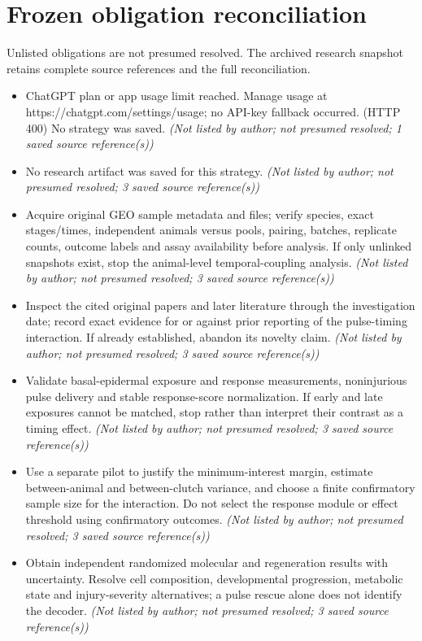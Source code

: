 \documentclass[11pt]{article}
\begin{document}
\section{Frozen obligation reconciliation}
Unlisted obligations are not presumed resolved. The archived research snapshot retains complete source references and the full reconciliation.
\begin{itemize}
\item ChatGPT plan or app usage limit reached. Manage usage at https://chatgpt.com/settings/usage; no API-key fallback occurred. (HTTP 400) No strategy was saved. \textit{ (Not listed by author; not presumed resolved; 1 saved source reference(s))}
\item No research artifact was saved for this strategy. \textit{ (Not listed by author; not presumed resolved; 3 saved source reference(s))}
\item Acquire original GEO sample metadata and files; verify species, exact stages/times, independent animals versus pools, pairing, batches, replicate counts, outcome labels and assay availability before analysis. If only unlinked snapshots exist, stop the animal-level temporal-coupling analysis. \textit{ (Not listed by author; not presumed resolved; 3 saved source reference(s))}
\item Inspect the cited original papers and later literature through the investigation date; record exact evidence for or against prior reporting of the pulse-timing interaction. If already established, abandon its novelty claim. \textit{ (Not listed by author; not presumed resolved; 3 saved source reference(s))}
\item Validate basal-epidermal exposure and response measurements, noninjurious pulse delivery and stable response-score normalization. If early and late exposures cannot be matched, stop rather than interpret their contrast as a timing effect. \textit{ (Not listed by author; not presumed resolved; 3 saved source reference(s))}
\item Use a separate pilot to justify the minimum-interest margin, estimate between-animal and between-clutch variance, and choose a finite confirmatory sample size for the interaction. Do not select the response module or effect threshold using confirmatory outcomes. \textit{ (Not listed by author; not presumed resolved; 3 saved source reference(s))}
\item Obtain independent randomized molecular and regeneration results with uncertainty. Resolve cell composition, developmental progression, metabolic state and injury-severity alternatives; a pulse rescue alone does not identify the decoder. \textit{ (Not listed by author; not presumed resolved; 3 saved source reference(s))}

\end{itemize}
\end{document}

